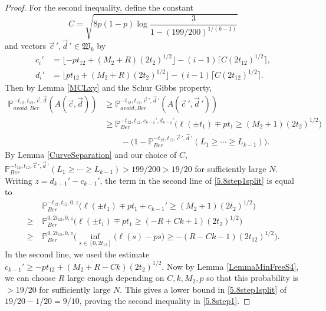 \begin{proof}
	For the second inequality, define the constant
	\begin{equation}\label{5.8C}
	C = \sqrt{8p(1-p)\log\frac{3}{1-(199/200)^{1/(k-1)}}}
	\end{equation}
	and vectors $\vec{c}\,', \vec{d}\,' \in \mathfrak{W}_k$ by
	\begin{align*}
	c_i' &= \lfloor -pt_{12} + (M_2+R)(2t_2)^{1/2}\rfloor - (i-1)\lceil C(2t_{12})^{1/2}\rceil,\\
	d_i' &= \lfloor pt_{12} + (M_2+R)(2t_2)^{1/2}\rfloor - (i-1)\lceil C(2t_{12})^{1/2}\rceil.
	\end{align*}
	Then by Lemma \ref{MCLxy} and the Schur Gibbs property,
	\begin{equation}\label{5.8step1split}
	\begin{split}
	\mathbb{P}^{-t_{12}, t_{12}, \vec{c}, \vec{d}}_{avoid, Ber} (A(\vec{c}, \vec{d})) &\geq \mathbb{P}^{-t_{12}, t_{12}, \vec{c}\,', \vec{d}\,'}_{avoid, Ber}(A(\vec{c}\,', \vec{d}\,'))\\ 
	&\geq \mathbb{P}^{-t_{12}, t_{12}, c_{k-1}', d_{k-1}'}_{Ber}\Big(\ell(\pm t_1) \mp pt_1 \geq (M_2+1)(2t_2)^{1/2}\Big)\\
	&\qquad - \big( 1 - \mathbb{P}^{-t_{12}, t_{12}, \vec{c}\,', \vec{d}\,'}_{Ber}(L_1 \geq \cdots \geq L_{k-1})\big).
	\end{split}
	\end{equation}
	By Lemma \ref{CurveSeparation} and our choice of $C$, $\mathbb{P}^{-t_{12}, t_{12}, \vec{c}\,', \vec{d}\,'}_{Ber}(L_1 \geq \cdots \geq L_{k-1})>199/200>19/20$ for sufficiently large $N$. Writing $z = d_{k-1}' - c_{k-1}'$, the term in the second line of \eqref{5.8step1split} is equal to
	\begin{align*}
	&\mathbb{P}^{-t_{12}, t_{12}, 0, z}_{Ber}\Big(\ell(\pm t_1) \mp pt_1 + c_{k-1}' \geq (M_2 + 1)(2t_2)^{1/2}\Big)\\
	\geq \; & \mathbb{P}^{0, 2t_{12}, 0, z}_{Ber}\Big(\ell(\pm t_1) \mp pt_1 \geq (-R+Ck+1)(2t_2)^{1/2}\Big)\\
	\geq \; & \mathbb{P}^{0, 2t_{12}, 0, z}_{Ber}\Big(\inf_{s\in[0,2t_{12}]}\big(\ell(s) - ps\big) \geq -(R-Ck-1)(2t_{12})^{1/2}\Big).
	\end{align*}
	In the second line, we used the estimate $c_{k-1}' \geq -pt_{12} + (M_2+R-Ck)(2t_2)^{1/2}$. Now by Lemma \ref{LemmaMinFreeS4}, we can choose $R$ large enough depending on $C,k,M_2,p$ so that this probability is $>19/20$ for sufficiently large $N$. This gives a lower bound in \eqref{5.8step1split} of $19/20 - 1/20 = 9/10$, proving the second inequality in \eqref{5.8step1}.
	

\end{proof}
